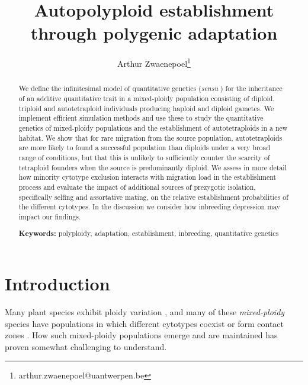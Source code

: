 \documentclass[12pt,a4paper]{article}
\begin{document}
\title{Autopolyploid establishment through polygenic adaptation}
\author[1]{Arthur Zwaenepoel\thanks{arthur.zwaenepoel@uantwerpen.be}}
\date{\vspace{-5ex}}
\maketitle
\begin{abstract}
We define the infinitesimal model of quantitative genetics (\textit{sensu}
    \cite{barton2017}) for the inheritance of an additive quantitative trait in
    a mixed-ploidy population consisting of diploid, triploid and
    autotetraploid individuals producing haploid and diploid gametes.  We
    implement efficient simulation methods and use these to study the
    quantitative genetics of mixed-ploidy populations and the establishment of
    autotetraploids in a new habitat.  We show that for rare migration from the
    source population, autotetraploids are more likely to found a successful
    population than diploids under a very broad range of conditions, but that
    this is unlikely to sufficiently counter the scarcity of tetraploid
    founders when the source is predominantly diploid.  We assess in more
    detail how minority cytotype exclusion interacts with migration load in the
    establishment process and evaluate the impact of additional sources of
    prezygotic isolation, specifically selfing and assortative mating, on the
    relative establishment probabilities of the different cytotypes.
    In the discussion we consider how inbreeding depression may impact our
    findings.

    \textbf{Keywords:} polyploidy, adaptation, establishment, inbreeding,
    quantitative genetics 
\end{abstract}

\section*{Introduction}


Many plant species exhibit ploidy variation
\citep{levin2002,soltis2007,rice2015}, and many of these \textit{mixed-ploidy}
species have populations in which different cytotypes coexist or form contact
zones \citep{kolar2017}.
How such mixed-ploidy populations emerge and are maintained has proven somewhat
challenging to understand.
\end{document}
